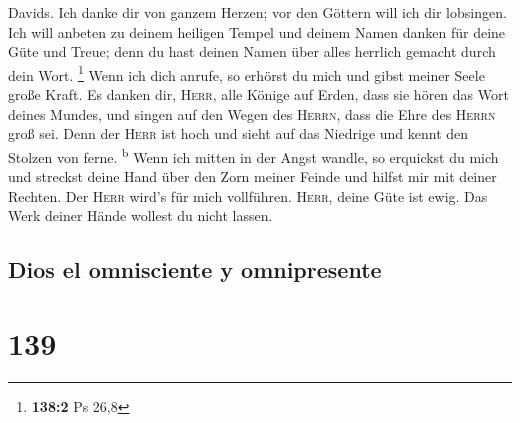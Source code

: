  Davids. Ich danke dir von ganzem Herzen; vor den Göttern
will ich dir lobsingen.  Ich will anbeten zu deinem
heiligen Tempel und deinem Namen danken für deine Güte und Treue; denn
du hast deinen Namen über alles herrlich gemacht durch dein Wort.
\footnote{\textbf{138:2} Ps 26,8}  Wenn ich dich anrufe,
so erhörst du mich und gibst meiner Seele große Kraft.  Es
danken dir, \textsc{Herr}, alle Könige auf Erden, dass sie hören das
Wort deines Mundes,  und singen auf den Wegen des
\textsc{Herrn}, dass die Ehre des \textsc{Herrn} groß sei.
 Denn der \textsc{Herr} ist hoch und sieht auf das
Niedrige und kennt den Stolzen von ferne. \textsuperscript{b}
 Wenn ich mitten in der Angst wandle, so erquickst du mich
und streckst deine Hand über den Zorn meiner Feinde und hilfst mir mit
deiner Rechten.  Der \textsc{Herr} wird's für mich
vollführen. \textsc{Herr}, deine Güte ist ewig. Das Werk deiner Hände
wollest du nicht lassen.

\hypertarget{dios-el-omnisciente-y-omnipresente}{%
\subsection{Dios el omnisciente y
omnipresente}\label{dios-el-omnisciente-y-omnipresente}}

\hypertarget{section-138}{%
\section{139}\label{section-138}}

